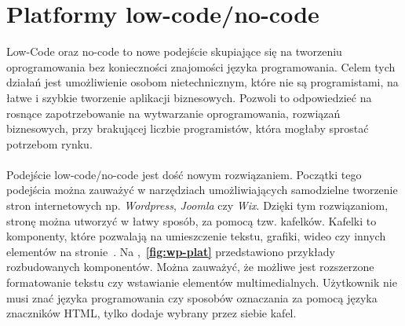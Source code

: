 \chapter{Platformy low-code/no-code}\label{cha:low}
Low-Code oraz no-code to nowe podejście skupiające się na tworzeniu oprogramowania bez konieczności znajomości języka programowania. Celem tych działań jest umożliwienie osobom nietechnicznym, które nie są programistami, na łatwe i szybkie tworzenie aplikacji biznesowych. Pozwoli to odpowiedzieć na rosnące zapotrzebowanie na wytwarzanie oprogramowania, rozwiązań biznesowych, przy brakującej liczbie programistów, która mogłaby sprostać potrzebom rynku.
\\ \\
Podejście low-code/no-code jest dość nowym rozwiązaniem. Początki tego podejścia można zauważyć w narzędziach umożliwiających samodzielne tworzenie stron internetowych np. \textit{Wordpress}, \textit{Joomla} czy \textit{Wix}. Dzięki tym rozwiązaniom, stronę można utworzyć w łatwy sposób, za pomocą tzw. kafelków. Kafelki to komponenty, które pozwalają na umieszczenie tekstu, grafiki, wideo czy innych elementów na stronie~\cite{Wordpress2023,Joomla2023,Wix2023}. Na ,~\textbf{\ref{fig:wp-plat}} przedstawiono przykłady rozbudowanych komponentów. Można zauważyć, że możliwe jest rozszerzone formatowanie tekstu czy wstawianie elementów multimedialnych. Użytkownik nie musi znać języka programowania czy sposobów oznaczania za pomocą języka znaczników HTML, tylko dodaje wybrany przez siebie kafel.

